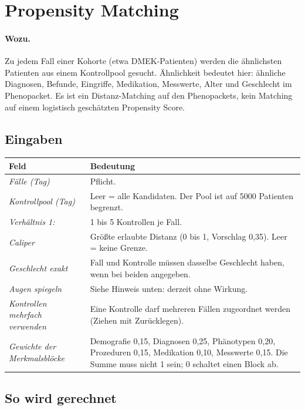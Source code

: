 \documentclass[11pt,a4paper,parskip=half-,headings=standardclasses,toc=bibliography,open=any]{scrreprt}
\newcommand{\feld}[1]{\textsf{\itshape #1}}
\begin{document}
\section{Propensity Matching}\label{sec:psm}

\paragraph{Wozu.} Zu jedem Fall einer Kohorte (etwa DMEK-Patienten) werden die ähnlichsten Patienten aus einem Kontrollpool gesucht. Ähnlichkeit bedeutet hier: ähnliche Diagnosen, Befunde, Eingriffe, Medikation, Messwerte, Alter und Geschlecht im Phenopacket. Es ist ein Distanz-Matching auf den Phenopackets, kein Matching auf einem logistisch geschätzten Propensity Score.

\subsection*{Eingaben}

\begin{longtable}{@{}P{4.4cm}p{10.2cm}@{}}
\toprule
\textbf{Feld} & \textbf{Bedeutung}\\
\midrule
\endhead
\feld{Fälle (Tag)} & Pflicht.\\
\feld{Kontrollpool (Tag)} & Leer = alle Kandidaten. Der Pool ist auf 5000 Patienten begrenzt.\\
\feld{Verhältnis 1:} & 1 bis 5 Kontrollen je Fall.\\
\feld{Caliper} & Größte erlaubte Distanz (0 bis 1, Vorschlag 0{,}35). Leer = keine Grenze.\\
\feld{Geschlecht exakt} & Fall und Kontrolle müssen dasselbe Geschlecht haben, wenn bei beiden angegeben.\\
\feld{Augen spiegeln} & Siehe Hinweis unten: derzeit ohne Wirkung.\\
\feld{Kontrollen mehrfach verwenden} & Eine Kontrolle darf mehreren Fällen zugeordnet werden (Ziehen mit Zurücklegen).\\
\feld{Gewichte der Merkmalsblöcke} & Demografie 0{,}15, Diagnosen 0{,}25, Phänotypen 0{,}20, Prozeduren 0{,}15, Medikation 0{,}10, Messwerte 0{,}15. Die Summe muss nicht 1 sein; 0 schaltet einen Block ab.\\
\bottomrule
\end{longtable}

\subsection*{So wird gerechnet}
\end{document}
